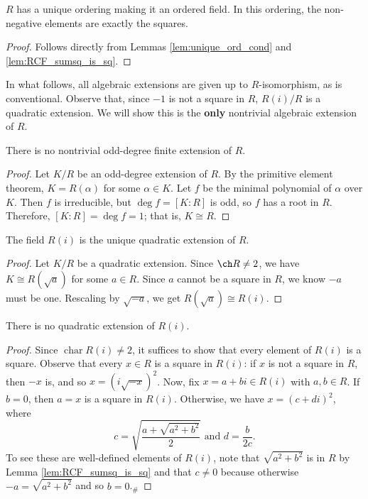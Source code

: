 \begin{lemma}
  \label{lem:RCF_ord_unique}
  \leanok
  $R$ has a unique ordering making it an ordered field. In this ordering, the non-negative elements are exactly the squares.
\end{lemma}
\begin{proof}
  \leanok
  Follows directly from Lemmas \ref{lem:unique_ord_cond} and \ref{lem:RCF_sumsq_is_sq}.
\end{proof}

In what follows, all algebraic extensions are given up to $R$-isomorphism, as is conventional. Observe that, since $-1$ is not a square in $R$, $R(i)/R$ is a quadratic extension. We will show this is the \textbf{only} nontrivial algebraic extension of $R$.

\begin{lemma}
  \label{lem:alg_ext_odd_deg}
  \leanok
  There is no nontrivial odd-degree finite extension of $R$.
\end{lemma}
\begin{proof}
  \leanok
  Let $K/R$ be an odd-degree extension of $R$. By the primitive element theorem, $K=R(\alpha)$ for some $\alpha\in K$. Let $f$ be the minimal polynomial of $\alpha$ over $K$. Then $f$ is irreducible, but $\deg f=[K:R]$ is odd, so $f$ has a root in $R$. Therefore, $[K:R]=\deg f=1$; that is, $K\cong R$.
\end{proof}

\begin{lemma}
  \label{lem:ext_deg_2}
  \leanok
  The field $R(i)$ is the unique quadratic extension of $R$.
\end{lemma}
\begin{proof}
  \leanok
  Let $K/R$ be a quadratic extension. Since $\ch R\neq2$, we have $K\cong R(\sqrt{a})$ for some $a\in R$. Since $a$ cannot be a square in $R$, we know $-a$ must be one. Rescaling by $\sqrt{-a}$, we get $R(\sqrt{a})\cong R(i)$.
\end{proof}

\begin{lemma}
  \label{lem:Ri_ext_deg_2}
  \leanok
  There is no quadratic extension of $R(i)$.
\end{lemma}
\begin{proof}
  \leanok
  Since $\operatorname{char}R(i)\neq 2$, it suffices to show that every element of $R(i)$ is a square. Observe that every $x\in R$ is a square in $R(i)$: if $x$ is not a square in $R$, then $-x$ is, and so $x=(i\sqrt{-x})^2$. Now, fix $x=a+bi\in R(i)$ with $a,b\in R$. If $b=0$, then $a=x$ is a square in $R(i)$. Otherwise, we have $x=(c+di)^2$, where
  \[c=\sqrt{\frac{a+\sqrt{a^2+b^2}}{2}}\text{ and }d=\frac{b}{2c}.\]
  To see these are well-defined elements of $R(i)$, note that $\sqrt{a^2+b^2}$ is in $R$ by Lemma \ref{lem:RCF_sumsq_is_sq} and that $c\neq0$ because otherwise $-a=\sqrt{a^2+b^2}$ and so $b=0$.$_\#$
\end{proof}

